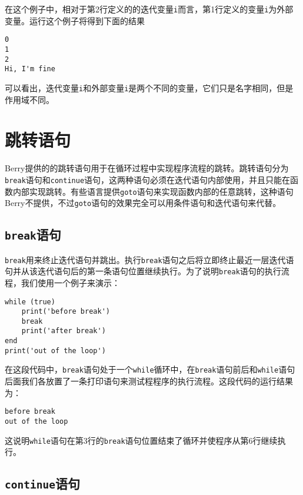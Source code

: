 在这个例子中，相对于第2行定义的的迭代变量\texttt{i}而言，第1行定义的变量\texttt{i}为外部变量。运行这个例子将得到下面的结果
\begin{lstlisting}[numbers=none]
0
1
2
Hi, I'm fine
\end{lstlisting}
可以看出，迭代变量\texttt{i}和外部变量\texttt{i}是两个不同的变量，它们只是名字相同，但是作用域不同。

\section{跳转语句}

Berry提供的的跳转语句用于在循环过程中实现程序流程的跳转。跳转语句分为\texttt{break}语句和\texttt{continue}语句，这两种语句必须在迭代语句内部使用，并且只能在函数内部实现跳转。有些语言提供\texttt{goto}语句来实现函数内部的任意跳转，这种语句Berry不提供，不过\texttt{goto}语句的效果完全可以用条件语句和迭代语句来代替。

\subsection{\texttt{break}语句}

\texttt{break}用来终止迭代语句并跳出。执行\texttt{break}语句之后将立即终止最近一层迭代语句并从该迭代语句后的第一条语句位置继续执行。为了说明\texttt{break}语句的执行流程，我们使用一个例子来演示：
\begin{lstlisting}[language=berry]
while (true)
    print('before break')
    break
    print('after break')
end
print('out of the loop')
\end{lstlisting}
在这段代码中，\texttt{break}语句处于一个\texttt{while}循环中，在\texttt{break}语句前后和\texttt{while}语句后面我们各放置了一条打印语句来测试程程序的执行流程。这段代码的运行结果为：
\begin{lstlisting}[numbers=none]
before break
out of the loop
\end{lstlisting}
这说明\texttt{while}语句在第3行的\texttt{break}语句位置结束了循环并使程序从第6行继续执行。

\subsection{\texttt{continue}语句}

